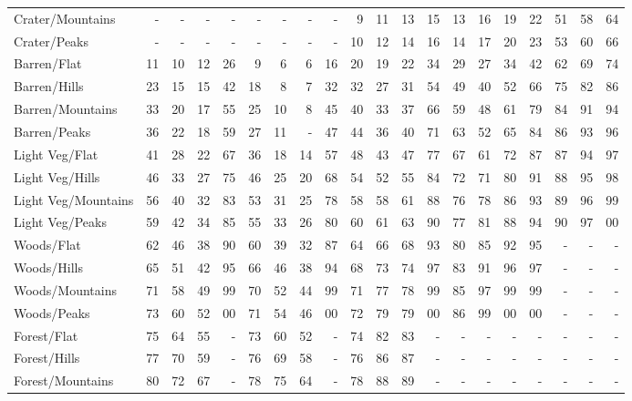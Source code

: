 \begin{table}[htbp]
{\begin{minipage}{\textwidth}
\begin{tabular}{l|rrrr|rrrr|rrrr|rrrr|rrr}
\rowcolor{grey}
Crater/Mountains & - & - & - & - & - & - & - & - & 9 & 11 & 13 & 15 & 13 & 16 & 19 & 22 & 51 & 58 & 64\\
Crater/Peaks & - & - & - & - & - & - & - & - & 10 & 12 & 14 & 16 & 14 & 17 & 20 & 23 & 53 & 60 & 66\\
        \hline
\rowcolor{grey}
Barren/Flat & 11 & 10 & 12 & 26 & 9 & 6 & 6 & 16 & 20 & 19 & 22 & 34 & 29 & 27 & 34 & 42 & 62 & 69 & 74\\
Barren/Hills & 23 & 15 & 15 & 42 & 18 & 8 & 7 & 32 & 32 & 27 & 31 & 54 & 49 & 40 & 52 & 66 & 75 & 82 & 86\\
\rowcolor{grey}
Barren/Mountains & 33 & 20 & 17 & 55 & 25 & 10 & 8 & 45 & 40 & 33 & 37 & 66 & 59 & 48 & 61 & 79 & 84 & 91 & 94\\
Barren/Peaks & 36 & 22 & 18 & 59 & 27 & 11 & - & 47 & 44 & 36 & 40 & 71 & 63 & 52 & 65 & 84 & 86 & 93 & 96\\
        \hline
\rowcolor{grey}
Light Veg/Flat & 41 & 28 & 22 & 67 & 36 & 18 & 14 & 57 & 48 & 43 & 47 & 77 & 67 & 61 & 72 & 87 & 87 & 94 & 97\\
Light Veg/Hills & 46 & 33 & 27 & 75 & 46 & 25 & 20 & 68 & 54 & 52 & 55 & 84 & 72 & 71 & 80 & 91 & 88 & 95 & 98\\
\rowcolor{grey}
Light Veg/Mountains & 56 & 40 & 32 & 83 & 53 & 31 & 25 & 78 & 58 & 58 & 61 & 88 & 76 & 78 & 86 & 93 & 89 & 96 & 99\\
Light Veg/Peaks & 59 & 42 & 34 & 85 & 55 & 33 & 26 & 80 & 60 & 61 & 63 & 90 & 77 & 81 & 88 & 94 & 90 & 97 & 00\\
        \hline
\rowcolor{grey}
Woods/Flat & 62 & 46 & 38 & 90 & 60 & 39 & 32 & 87 & 64 & 66 & 68 & 93 & 80 & 85 & 92 & 95 & - & - & -\\
Woods/Hills & 65 & 51 & 42 & 95 & 66 & 46 & 38 & 94 & 68 & 73 & 74 & 97 & 83 & 91 & 96 & 97 & - & - & -\\
\rowcolor{grey}
Woods/Mountains & 71 & 58 & 49 & 99 & 70 & 52 & 44 & 99 & 71 & 77 & 78 & 99 & 85 & 97 & 99 & 99 & - & - & -\\
Woods/Peaks & 73 & 60 & 52 & 00 & 71 & 54 & 46 & 00 & 72 & 79 & 79 & 00 & 86 & 99 & 00 & 00 & - & - & -\\
        \hline
\rowcolor{grey}
Forest/Flat & 75 & 64 & 55 & - & 73 & 60 & 52 & - & 74 & 82 & 83 & - & - & - & - & - & - & - & -\\
Forest/Hills & 77 & 70 & 59 & - & 76 & 69 & 58 & - & 76 & 86 & 87 & - & - & - & - & - & - & - & -\\
\rowcolor{grey}
Forest/Mountains & 80 & 72 & 67 & - & 78 & 75 & 64 & - & 78 & 88 & 89 & - & - & - & - & - & - & - & -\\

\end{tabular}
\end{minipage}}
\end{table}
